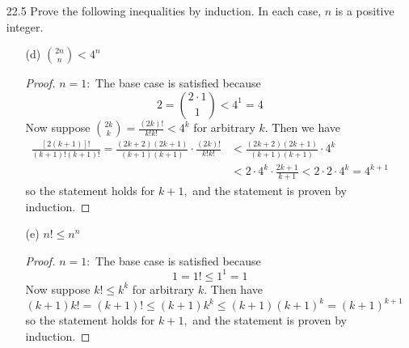 \documentclass{article}
\begin{document}
\begin{itemize}
\begin{itemize}
		\end{itemize}

		\newpage
	\item[22.5] Prove the following inequalities by induction. In each case, $n$ is a positive integer.
		\begin{itemize}
			\item[(d)] $\binom{2n}{n}<4^n$
				\begin{proof}
					$n=1:$ The base case is satisfied because 
					\[2=\binom{2\cdot 1}{1} < 4^1 = 4\]
					Now suppose $\binom{2k}{k}=\frac{(2k)!}{k!k!}<4^k$ for arbitrary $k.$ Then we have
					\begin{align*}
						\frac{\left[ 2(k+1) \right]!}{(k+1)!(k+1)!} = \frac{(2k+2)(2k+1)}{(k+1)(k+1)}\cdot \frac{(2k)!}{k!k!} &< \frac{(2k+2)(2k+1)}{(k+1)(k+1)}\cdot 4^k \\
						&< 2\cdot 4^k\cdot \frac{2k+1}{k+1} < 2\cdot 2\cdot 4^k = 4^{k+1}
					\end{align*}
					so the statement holds for $k+1,$ and the statement is proven by induction.
				\end{proof}

			\item[(e)] $n!\le n^n$
				\begin{proof}
					$n=1:$ The base case is satisfied because
					\[1=1!\le 1^1=1\]
					Now suppose $k!\le k^k$ for arbitrary $k.$ Then have
					\[(k+1)k!=(k+1)!\le (k+1) k^k \le (k+1)(k+1)^{k} = (k+1)^{k+1}\]
					so the statement holds for $k+1,$ and the statement is proven by induction.
				\end{proof}
				
		\end{itemize}

\end{itemize}
\end{document}
